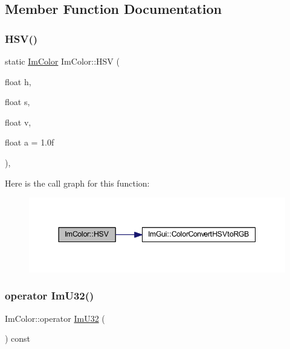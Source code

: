 \subsection{Member Function Documentation}
\mbox{\label{struct_im_color_ac8cb52119648523038818a613becf010}} 
\subsubsection{\texorpdfstring{H\+S\+V()}{HSV()}}
{\footnotesize\ttfamily static \mbox{\hyperlink{struct_im_color}{Im\+Color}} Im\+Color\+::\+H\+SV (\begin{DoxyParamCaption}\item[{float}]{h,  }\item[{float}]{s,  }\item[{float}]{v,  }\item[{float}]{a = {\ttfamily 1.0f} }\end{DoxyParamCaption})\hspace{0.3cm}{\ttfamily [inline]}, {\ttfamily [static]}}

Here is the call graph for this function\+:
\nopagebreak
\begin{figure}[H]
\begin{center}
\leavevmode
\includegraphics[width=344pt]{struct_im_color_ac8cb52119648523038818a613becf010_cgraph}
\end{center}
\end{figure}
\mbox{\label{struct_im_color_a4f4fc53e0676d50404d6d5ffcf16637f}} 
\subsubsection{\texorpdfstring{operator Im\+U32()}{operator ImU32()}}
{\footnotesize\ttfamily Im\+Color\+::operator \mbox{\hyperlink{imgui_8h_a118cff4eeb8d00e7d07ce3d6460eed36}{Im\+U32}} (\begin{DoxyParamCaption}{ }\end{DoxyParamCaption}) const\hspace{0.3cm}{\ttfamily [inline]}}

